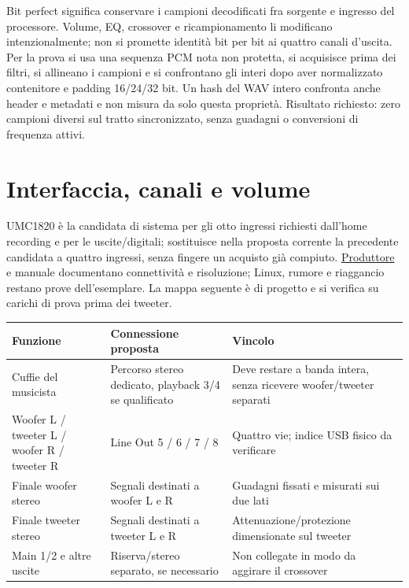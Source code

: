 \documentclass[
  italian,
  11pt,
  a4paper,
]{article}
\newcounter{none} %
\begin{document}
Bit perfect significa conservare i campioni decodificati fra sorgente e ingresso del
processore. Volume, EQ, crossover e ricampionamento li modificano intenzionalmente; non si
promette identità bit per bit ai quattro canali d'uscita. Per la prova si usa una sequenza
PCM nota non protetta, si acquisisce prima dei filtri, si allineano i campioni e si
confrontano gli interi dopo aver normalizzato contenitore e padding 16/24/32 bit. Un hash
del WAV intero confronta anche header e metadati e non misura da solo questa proprietà.
Risultato richiesto: zero campioni diversi sul tratto sincronizzato, senza guadagni o
conversioni di frequenza attivi.

\section{Interfaccia, canali e volume}\label{interfaccia-canali-e-volume}

UMC1820 è la candidata di sistema per gli otto ingressi richiesti dall'home recording e per
le uscite/digitali; sostituisce nella proposta corrente la precedente candidata a quattro
ingressi, senza fingere un acquisto già compiuto.
\href{https://behringer.com/en/products/0805-AAN}{Produttore} e manuale documentano
connettività e risoluzione; Linux, rumore e riaggancio restano prove dell'esemplare. La
mappa seguente è di progetto e si verifica su carichi di prova prima dei tweeter.

{\def\LTcaptype{none} %
\begin{longtable}[]{@{}
  >{\raggedright\arraybackslash}p{}
  >{\raggedright\arraybackslash}p{}
  >{\raggedright\arraybackslash}p{}@{}}
\toprule\noalign{}
\begin{minipage}[b]{\linewidth}\raggedright
Funzione
\end{minipage} & \begin{minipage}[b]{\linewidth}\raggedright
Connessione proposta
\end{minipage} & \begin{minipage}[b]{\linewidth}\raggedright
Vincolo
\end{minipage} \\
\midrule\noalign{}
\endhead
\bottomrule\noalign{}
\endlastfoot
Cuffie del musicista & Percorso stereo dedicato, playback 3/4 se qualificato & Deve restare
a banda intera, senza ricevere woofer/tweeter separati \\
Woofer L / tweeter L / woofer R / tweeter R & Line Out 5 / 6 / 7 / 8 & Quattro vie; indice
USB fisico da verificare \\
Finale woofer stereo & Segnali destinati a woofer L e R & Guadagni fissati e misurati sui
due lati \\
Finale tweeter stereo & Segnali destinati a tweeter L e R & Attenuazione/protezione
dimensionate sul tweeter \\
Main 1/2 e altre uscite & Riserva/stereo separato, se necessario & Non collegate in modo da
aggirare il crossover \\
\end{longtable}
}
\end{document}
